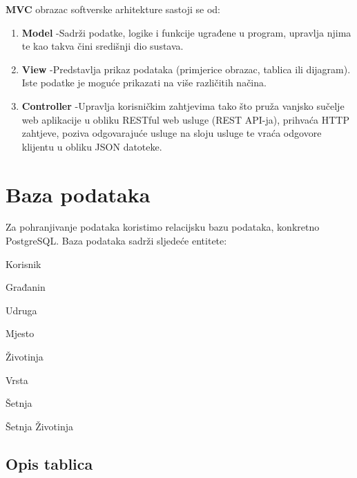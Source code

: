 		
		\textbf{MVC} obrazac softverske arhitekture sastoji se od:
			\begin{enumerate}
				\item  \textbf{Model} -Sadrži podatke, logike i funkcije ugrađene u program, upravlja njima te kao takva čini središnji dio sustava.
				
				\item  \textbf{View} -Predstavlja prikaz podataka (primjerice obrazac, tablica ili dijagram). Iste podatke je moguće prikazati na više različitih načina.
				
				\item  \textbf{Controller} -Upravlja korisničkim zahtjevima tako što pruža vanjsko sučelje web aplikacije u obliku RESTful web usluge (REST API-ja), prihvaća HTTP zahtjeve, poziva odgovarajuće usluge na sloju usluge te vraća odgovore klijentu u obliku JSON datoteke.\\
			\end{enumerate}
		
				
		\section{Baza podataka}
			
			\noindent Za pohranjivanje podataka koristimo relacijsku bazu podataka, konkretno PostgreSQL. 
			Baza podataka sadrži sljedeće entitete:
				
				\begin{packed_item}
					\item Korisnik
					\item Građanin
					\item Udruga
					\item Mjesto
					\item Životinja
					\item Vrsta
					\item Šetnja
					\item Šetnja Životinja
				\end{packed_item}
		
			\subsection{Opis tablica}
				
